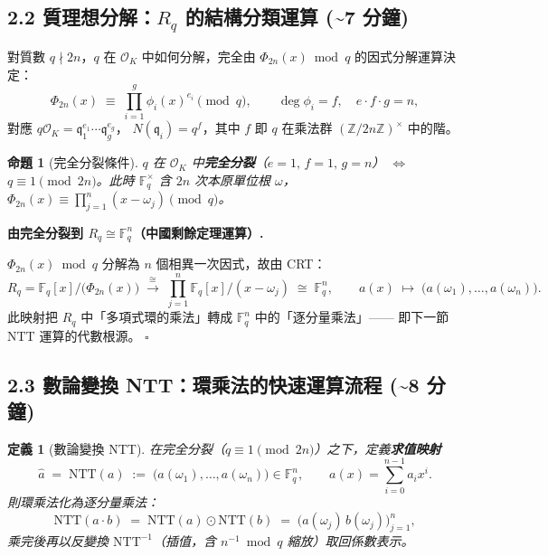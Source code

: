 \documentclass[10.5pt, a4paper]{article}
\theoremstyle{cpt}
\newtheorem{definition}{定義}
\newtheorem{proposition}{命題}
\newenvironment{proofbox}[1][證明]{%
  \begin{tcolorbox}[colback=thmfill, colframe=accent!40,
    breakable, left=5pt, right=5pt, top=3pt, bottom=3pt, boxrule=0.4pt]
  \noindent\textbf{\color{accent}#1.}\quad\small
}{%
  \hfill$\square$\end{tcolorbox}\vspace{-1pt}
}
\begin{document}
\subsection{2.2 \;質理想分解：$R_q$ 的結構分類運算 \hfill {\footnotesize\color{gray}(\textasciitilde 7 分鐘)}}

對質數 $q\nmid 2n$，$q$ 在 $\mathcal{O}_K$ 中如何分解，完全由
$\Phi_{2n}(x) \bmod q$ 的因式分解運算決定：
\[
  \Phi_{2n}(x) \;\equiv\; \prod_{i=1}^{g}\phi_i(x)^{e_i} \pmod q,
  \qquad \deg\phi_i = f,\quad e\cdot f \cdot g = n,
\]
對應 $q\mathcal{O}_K = \mathfrak{q}_1^{e_1}\cdots\mathfrak{q}_g^{e_g}$，
$N(\mathfrak{q}_i)=q^f$，其中 $f$ 即 $q$ 在乘法群 $(\mathbb{Z}/2n\mathbb{Z})^\times$ 中的階。

\begin{proposition}[完全分裂條件]
  $q$ 在 $\mathcal{O}_K$ 中\textbf{完全分裂}（$e=1,\,f=1,\,g=n$）
  $\iff$ $q \equiv 1 \pmod{2n}$。此時 $\mathbb{F}_q^\times$ 含 $2n$ 次本原單位根
  $\omega$，$\Phi_{2n}(x)\equiv\prod_{j=1}^{n}(x-\omega_j)\pmod q$。
\end{proposition}

\begin{proofbox}[由完全分裂到 $R_q\cong\mathbb{F}_q^n$（中國剩餘定理運算）]
  $\Phi_{2n}(x)\bmod q$ 分解為 $n$ 個相異一次因式，故由 CRT：
  \[
    R_q = \mathbb{F}_q[x]/\bigl(\Phi_{2n}(x)\bigr)
        \;\xrightarrow{\ \cong\ }\;
        \prod_{j=1}^{n}\mathbb{F}_q[x]/(x-\omega_j)
        \;\cong\; \mathbb{F}_q^n,
    \qquad
    a(x)\;\longmapsto\;\bigl(a(\omega_1),\ldots,a(\omega_n)\bigr).
  \]
  此映射把 $R_q$ 中「多項式環的乘法」轉成 $\mathbb{F}_q^n$ 中的「逐分量乘法」——
  即下一節 NTT 運算的代數根源。
\end{proofbox}

\subsection{2.3 \;數論變換 NTT：環乘法的快速運算流程 \hfill {\footnotesize\color{gray}(\textasciitilde 8 分鐘)}}

\begin{definition}[數論變換 NTT]
  在完全分裂（$q\equiv 1\!\!\pmod{2n}$）之下，定義\textbf{求值映射}
  \[
    \widehat{a} \;=\; \mathrm{NTT}(a) \;:=\; \bigl(a(\omega_1),\ldots,a(\omega_n)\bigr)\in\mathbb{F}_q^n,
    \qquad a(x)=\sum_{i=0}^{n-1}a_i x^i .
  \]
  則環乘法化為逐分量乘法：
  \[
    \mathrm{NTT}(a\cdot b) \;=\; \mathrm{NTT}(a)\odot\mathrm{NTT}(b)
    \;=\; \bigl(a(\omega_j)\,b(\omega_j)\bigr)_{j=1}^{n},
  \]
  乘完後再以反變換 $\mathrm{NTT}^{-1}$（插值，含 $n^{-1} \bmod q$ 縮放）取回係數表示。
\end{definition}
\end{document}
